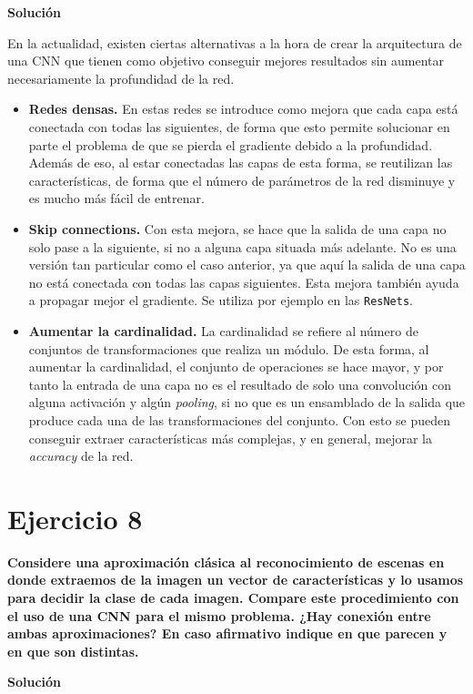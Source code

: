 \documentclass[11pt,a4paper]{article}
\newcommand{\answer}{\noindent\textbf{Solución}}
\newcommand{\question}[1]{\noindent\textbf{#1}}
\newcommand{\nonumsection}[1]{\section*{#1}\addcontentsline{toc}{section}{#1}}
\begin{document}
\answer

En la actualidad, existen ciertas alternativas a la hora de crear la arquitectura
de una CNN que tienen como objetivo conseguir mejores resultados sin aumentar
necesariamente la profundidad de la red.

\begin{itemize}[label=\textbullet]
  \item \textbf{Redes densas.} \cite{DBLP:journals/corr/HuangLW16a}
  En estas redes se introduce como mejora
  que cada capa está conectada con todas las siguientes, de
  forma que esto permite solucionar en parte el problema de que se pierda
  el gradiente debido a la profundidad. Además de eso, al estar conectadas
  las capas de esta forma, se reutilizan las características, de forma que
  el número de parámetros de la red disminuye y es mucho más fácil de entrenar.
  \item \textbf{Skip connections.} Con esta mejora, se hace que la salida
  de una capa no solo pase a la siguiente, si no a alguna capa situada
  más adelante. No es una versión tan particular como el caso anterior,
  ya que aquí la salida de una capa no está conectada con todas las
  capas siguientes. Esta mejora también ayuda a propagar mejor el gradiente.
  Se utiliza por ejemplo en las \texttt{ResNets}.
  \item \textbf{Aumentar la cardinalidad.} \cite{DBLP:journals/corr/XieGDTH16}
  La cardinalidad se refiere al número de conjuntos de transformaciones que
  realiza un módulo. De esta forma, al aumentar la cardinalidad, el conjunto de
  operaciones se hace mayor, y por tanto la entrada de una capa no es el resultado
  de solo una convolución con alguna activación y algún \textit{pooling}, si no que
  es un ensamblado de la salida que produce cada una de las transformaciones del
  conjunto. Con esto se pueden conseguir extraer características más complejas,
  y en general, mejorar la \textit{accuracy} de la red.
\end{itemize}


\nonumsection{Ejercicio 8}

\question{Considere una aproximación clásica al reconocimiento de escenas
en donde extraemos de la imagen un vector de características y lo
usamos para decidir la clase de cada imagen. Compare este
procedimiento con el uso de una CNN para el mismo problema. ¿Hay
conexión entre ambas aproximaciones? En caso afirmativo indique en
que parecen y en que son distintas.}

\answer
\end{document}
